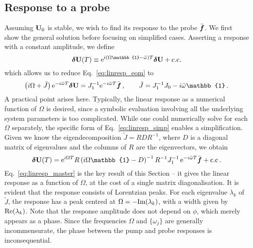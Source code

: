\subsection{Response to a probe} \label{sec:linresp_response1}
Assuming $\vb{U}_0$ is stable, we wish to find its response to the probe $\bar{\boldsymbol{f}}$. We first show the general solution before focusing on simplified cases. Asserting a response with a constant amplitude, we define
\begin{equation} \label{eq:linresp_steady_resp}
\bdel{U}(T) \equiv  \e^{i(\Omega \mathbb{1}- \tilde{\omega}) T} \bdel{U} + \text{c.c.} 
\end{equation}
which allows us to reduce Eq.~\eqref{eq:linresp_eom} to
\begin{equation} \label{eq:linresp_simp}
\left( i \Omega + \tilde{J}\right) \e^{-i \tilde{\omega}T} \bdel{U} = J_1^{-1} \e^{-i \tilde{\omega} T} \bbar{f} \,, \qquad \tilde{J} = J_1^{-1} J_0 - i \tilde{\omega} \mathbb{1}\,.
\end{equation}
A practical point arises here. Typically, the linear response as a numerical function of $\Omega$ is desired, since a symbolic evaluation involving all the underlying system parameters is too complicated. While one could numerically solve for each $\Omega$ separately, the specific form of Eq.~\eqref{eq:linresp_simp} enables a simplification. Given we know the eigendecomposition $\tilde{J} = R D R^{-1}$, where $D$ is a diagonal matrix of eigenvalues and the columns of $R$ are the eigenvectors, we obtain 
\begin{equation} \label{eq:linresp_master}
\bdel{U}(T) = \e^{i \Omega T} R \left( i \Omega \mathbb{1} - D \right)^{-1} R^{-1} J_1^{-1} \,\e^{-i \tilde{\omega} T} \bbar{f} + \text{c.c} \,.
\end{equation}
Eq.~\eqref{eq:linresp_master} is the key result of this Section -- it gives the linear response as a function of $\Omega$, at the cost of a single matrix diagonalisation. It is evident that the response consists of Lorentzian peaks. For each eigenvalue $\lambda_k$ of $\tilde{J}$, the response has a peak centred at $\Omega = -\text{Im} (\lambda_k)$, with a width given by $\text{Re} (\lambda_k)$. Note that the response amplitude does not depend on $\phi$, which merely appears as a phase. Since the frequencies $\Omega$ and $\{\omega_j\}$ are generally incommensurate, the phase between the pump and probe responses is inconsequential.

